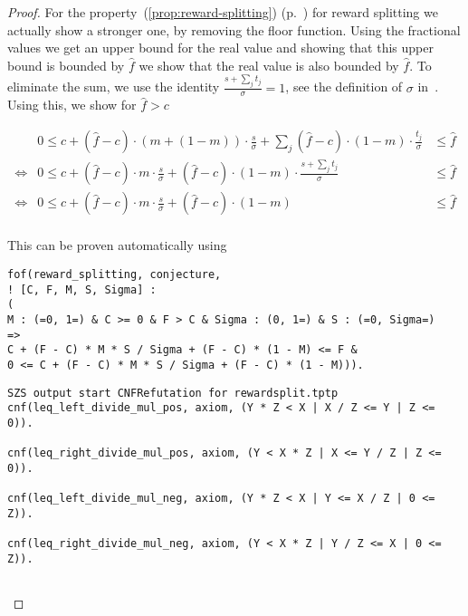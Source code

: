 \begin{proof}
  For the property~(\ref{prop:reward-splitting})
  (p.~\pageref{prop:reward-splitting}) for reward splitting we actually show a
  stronger one, by removing the floor function. Using the fractional values we
  get an upper bound for the real value and showing that this upper bound is
  bounded by $\hat{f}$ we show that the real value is also bounded by
  $\hat{f}$. To eliminate the sum, we use the identity $\frac{s +
    \sum_{j}t_{j}}{\sigma} = 1$, see the definition of
  $\sigma$ in~\cite{delegation_design}. Using this, we show for $\hat{f} > c$

  \begin{equation*}
    \begin{array}{cll}
      & 0 \leq c + (\hat{f} - c)\cdot (m + (1 - m))\cdot \frac{s}{\sigma} +
        \sum_{j}(\hat{f}-c)\cdot(1-m)\cdot\frac{t_{j}}{\sigma} & \leq \hat{f} \\
      \Leftrightarrow &
                        0\leq c + (\hat{f}-c)\cdot m \cdot \frac{s}{\sigma} + (\hat{f}
                        -c)\cdot(1-m)\cdot\frac{s + \sum_{j}t_{j}}{\sigma} & \leq \hat{f} \\
      \Leftrightarrow &
                        0\leq c + (\hat{f}-c)\cdot m \cdot \frac{s}{\sigma} + (\hat{f}
                        -c)\cdot(1-m) & \leq \hat{f} \\
    \end{array}
  \end{equation*}

  This can be proven automatically using

\begin{verbatim}
fof(reward_splitting, conjecture,
! [C, F, M, S, Sigma] :
(
M : (=0, 1=) & C >= 0 & F > C & Sigma : (0, 1=) & S : (=0, Sigma=)
=>
C + (F - C) * M * S / Sigma + (F - C) * (1 - M) <= F &
0 <= C + (F - C) * M * S / Sigma + (F - C) * (1 - M))).
\end{verbatim}

  \ifproofs
\begin{verbatim}
SZS output start CNFRefutation for rewardsplit.tptp
cnf(leq_left_divide_mul_pos, axiom, (Y * Z < X | X / Z <= Y | Z <= 0)).

cnf(leq_right_divide_mul_pos, axiom, (Y < X * Z | X <= Y / Z | Z <= 0)).

cnf(leq_left_divide_mul_neg, axiom, (Y * Z < X | Y <= X / Z | 0 <= Z)).

cnf(leq_right_divide_mul_neg, axiom, (Y < X * Z | Y / Z <= X | 0 <= Z)).


\end{verbatim}
\end{proof}
